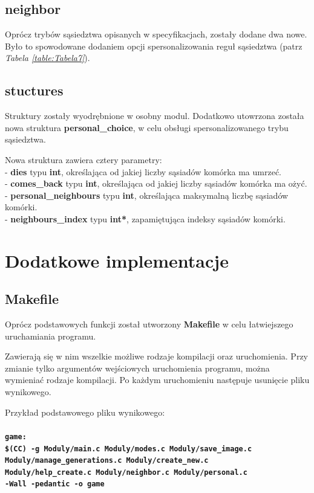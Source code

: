 \documentclass[a4paper]{article}
\begin{document}
\subsection{neighbor}

\quad Opr\'ocz tryb\'ow s\k{a}siedztwa opisanych w specyfikacjach, zosta\l{}y dodane dwa nowe.
By\l{}o to spowodowane dodaniem opcji spersonalizowania regu\l{} s\k{a}siedztwa (patrz \textit{Tabela \ref{table:Tabela7}}).


\subsection{stuctures}
\quad Struktury zosta\l{}y wyodr\k{e}bnione w osobny modul{}.
Dodatkowo utowrzona zosta\l{}a nowa struktura \textbf{personal\_choice}, w celu obs\l{}ugi spersonalizowanego trybu s\k{a}siedztwa.


Nowa struktura zawiera cztery parametry:\\
 - \textbf{dies} typu \textbf{int}, okre\'slaj\k{a}ca od jakiej liczby s\k{a}siad\'ow kom\'orka ma umrze\'c. \\
 - \textbf{comes\_back} typu \textbf{int}, okre\'slaj\k{a}ca od jakiej liczby s\k{a}siad\'ow kom\'orka ma o\.zy\'c. \\
 - \textbf{personal\_neighbours} typu \textbf{int}, okre\'slaj\k{a}ca maksymaln\k{a} liczb\k{e} s\k{a}siad\'ow kom\'orki. \\
 - \textbf{neighbours\_index} typu \textbf{int*}, zapami\k{e}tuj\k{a}ca indeksy s\k{a}siad\'ow kom\'orki. \\

\section{Dodatkowe implementacje}

\subsection{Makefile}

\quad Opr\'ocz podstawowych funkcji zosta\l{} utworzony \textbf{Makefile} w celu \l{}atwiejszego uruchamiania programu.


Zawieraj\k{a} si\k{e} w nim wszelkie mo\.zliwe rodzaje kompilacji oraz uruchomienia.
Przy zmianie tylko argument\'ow wej\'sciowych uruchomienia programu, mo\.zna wymienia\'c rodzaje kompilacji.
Po ka\.zdym uruchomieniu nast\k{e}puje usuni\k{e}cie pliku wynikowego.


Przyk\l{}ad podstawowego pliku wynikowego:\\ \\
\textbf{\texttt{game: \\
\$(CC) -g Moduly/main.c Moduly/modes.c Moduly/save\_image.c \\
Moduly/manage\_generations.c Moduly/create\_new.c \\ 
Moduly/help\_create.c Moduly/neighbor.c Moduly/personal.c\\
-Wall -pedantic -o game\\
}}
\\
\\
\end{document}
